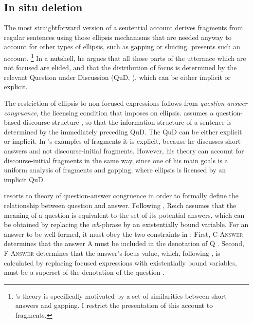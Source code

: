 \subsection{In situ deletion} \label{sec:theories-insitu}

The most straightforward version of a sentential account derives fragments from regular sentences using those ellipsis mechanisms that are needed anyway to account for other types of ellipsis, such as gapping or sluicing. \citet{reich2007} presents such an account.%
%
\footnote{\citeauthor{reich2007}'s theory is specifically motivated by a set of similarities between short answers and gapping. I restrict the presentation of this account to fragments.}\afterfn%
%
In a nutshell, he argues that all those parts of the utterance which are not focused are elided, and that the distribution of focus is determined by the relevant Question under Discussion (QuD, ), which can be either implicit or explicit.

The restriction of ellipsis to non-focused expressions follows from \textit{ques\-tion-answer congruence}, the licensing condition that \citet{reich2007} imposes on ellipsis. \citet{reich2007} assumes a question-based discourse structure \citep[following][]{roberts1996}, so that the information structure of a sentence is determined by the immediately preceding QuD. The QuD can be either explicit or implicit. In \citeauthor{reich2007}'s examples of fragments it is explicit, because he discusses short answers and not discourse-initial fragments. However, his theory can account for discourse-initial fragments in the same way, since one of his main goals is a uniform analysis of fragments and gapping, where ellipsis is licensed by an implicit QuD.

\citet{reich2007} resorts to  theory of question-answer congruence in order to formally define the relationship between question and answer. Following \citet{rooth1992}, Reich assumes that the meaning of a question is equivalent to the set of its potential answers, which can be obtained by replacing the \textit{wh}-phrase by an existentially bound variable. For an answer to be well-formed, it must obey the two constraints in \Next: First, \textsc{C-Answer} \Next[a] determines that the answer A must be included in the denotation of Q \citep[472]{reich2007}. Second, \textsc{F-Answer} determines that the answer's focus value, which, following \citet{rooth1992}, is calculated by replacing focused expressions with existentially bound variables, must be a superset of the denotation of the question \citep[472]{reich2007}.


